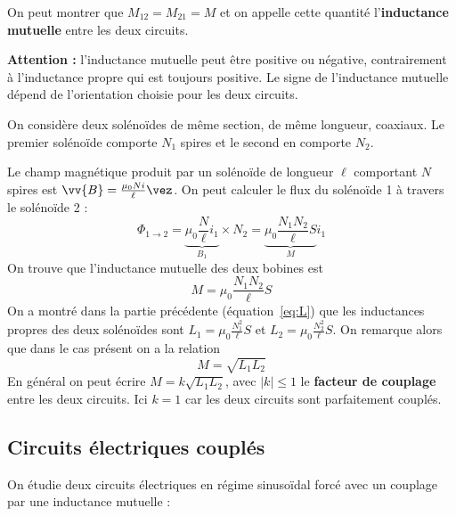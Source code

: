 \documentclass{cours}
\begin{document}
On peut montrer que $M_{12} = M_{21} = M$ et on appelle cette quantité l'\textbf{inductance mutuelle} entre les deux circuits.  

\textbf{Attention : } l'inductance mutuelle peut être positive ou négative, contrairement à l'inductance propre qui est toujours positive. Le signe de l'inductance mutuelle dépend de l'orientation choisie pour les deux circuits. 

\begin{application}
  On considère deux solénoïdes de même section, de même longueur, coaxiaux. Le premier solénoïde comporte $N_1$ spires et le second en comporte $N_2$. 

  Le champ magnétique produit par un solénoïde de longueur $\ell$ comportant $N$ spires est $\vv{B} = \frac{\mu_0 N i}{\ell}\vez$. On peut calculer le flux du solénoïde 1 à travers le solénoïde 2 :
  \begin{equation}
    \Phi_{1\rightarrow 2} = \underbrace{\mu_0\frac{N}{\ell}i_1}_{B_1} \times N_2 = \underbrace{\mu_0 \frac{N_1N_2}{\ell}S}_{M}i_1
  \end{equation}
  On trouve que l'inductance mutuelle des deux bobines est 
  \begin{equation}
    M=\mu_0 \frac{N_1N_2}{\ell}S
  \end{equation}
  On a montré dans la partie précédente (équation~\ref{eq:L}) que les inductances propres des deux solénoïdes sont $L_1 = \mu_0 \frac{N_1^2}{\ell}S$ et $L_2 = \mu_0 \frac{N_2^2}{\ell}S$. On remarque alors que dans le cas présent on a la relation
 \begin{equation}
    M = \sqrt{L_1L_2}
  \end{equation}
  En général on peut écrire $M=k\sqrt{L_1L_2}$, avec $|k|\leq 1$ le \textbf{facteur de couplage} entre les deux circuits. Ici $k=1$ car les deux circuits sont parfaitement couplés.  
\end{application}
\subsection{Circuits électriques couplés}%
\label{sub:circuits_electriques_couples}
On étudie deux circuits électriques en régime sinusoïdal forcé avec un couplage par une inductance mutuelle :
\begin{center}
\end{center}
\end{document}
